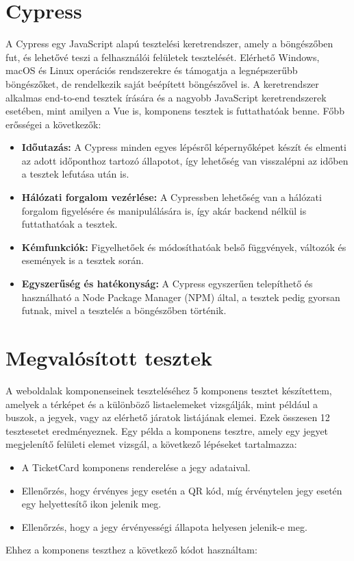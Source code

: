 \section{Cypress}
A Cypress egy JavaScript alapú tesztelési keretrendszer, amely a böngészőben fut, és lehetővé teszi a felhasználói felületek tesztelését. Elérhető Windows, macOS és Linux operációs rendszerekre és támogatja a legnépszerűbb böngészőket, de rendelkezik saját beépített böngészővel is. A keretrendszer alkalmas end-to-end tesztek írására és a nagyobb JavaScript keretrendszerek esetében, mint amilyen a Vue is, komponens tesztek is futtathatóak benne. Főbb erősségei a következők:
\begin{itemize}
    \item \textbf{Időutazás:} A Cypress minden egyes lépésről képernyőképet készít és elmenti az adott időponthoz tartozó állapotot, így lehetőség van visszalépni az időben a tesztek lefutása után is.
    \item \textbf{Hálózati forgalom vezérlése:} A Cypressben lehetőség van a hálózati forgalom figyelésére és manipulálására is, így akár backend nélkül is futtathatóak a tesztek.
    \item \textbf{Kémfunkciók:} Figyelhetőek és módosíthatóak belső függvények, változók és események is a tesztek során.
    \item \textbf{Egyszerűség és hatékonyság:} A Cypress egyszerűen telepíthető és használható a Node Package Manager (NPM) által, a tesztek pedig gyorsan futnak, mivel a tesztelés a böngészőben történik.
\end{itemize}

\section{Megvalósított tesztek}
A weboldalak komponenseinek teszteléséhez 5 komponens tesztet készítettem, amelyek a térképet és a különböző listaelemeket vizsgálják, mint például a buszok, a jegyek, vagy az elérhető járatok listájának elemei. Ezek összesen 12 tesztesetet eredményeznek. Egy példa a komponens tesztre, amely egy jegyet megjelenítő felületi elemet vizsgál, a következő lépéseket tartalmazza:
\begin{itemize}
  \item A TicketCard komponens renderelése a jegy adataival.
  \item Ellenőrzés, hogy érvényes jegy esetén a QR kód, míg érvénytelen jegy esetén egy helyettesítő ikon jelenik meg.
  \item Ellenőrzés, hogy a jegy érvényességi állapota helyesen jelenik-e meg.
\end{itemize}
Ehhez a komponens teszthez a következő kódot használtam:

